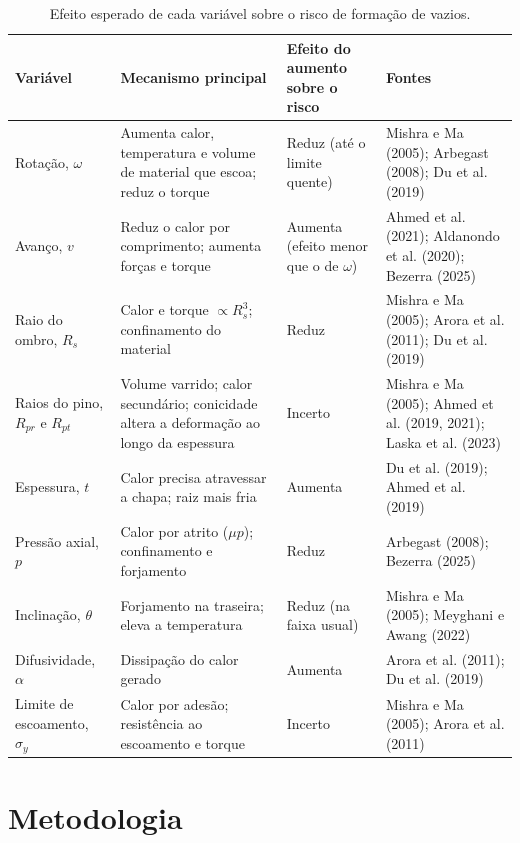 \documentclass[12pt,openany]{report}
\begin{document}
\begin{table}[htbp]
\centering
\caption{Efeito esperado de cada variável sobre o risco de formação de vazios.}
\label{tab:sintese}
\small
\begin{tabularx}{\textwidth}{L{2.3cm} Y L{2.4cm} L{3.7cm}}
\toprule
\textbf{Variável} & \textbf{Mecanismo principal} & \textbf{Efeito do aumento sobre o risco} & \textbf{Fontes} \\ \midrule
Rotação, $\omega$ & Aumenta calor, temperatura e volume de material que escoa; reduz o torque & Reduz (até o limite quente) & Mishra e Ma (2005); Arbegast (2008); Du et al. (2019) \\
Avanço, $v$ & Reduz o calor por comprimento; aumenta forças e torque & Aumenta (efeito menor que o de $\omega$) & Ahmed et al. (2021); Aldanondo et al. (2020); Bezerra (2025) \\
Raio do ombro, $R_s$ & Calor e torque $\propto R_{s}^{3}$; confinamento do material & Reduz & Mishra e Ma (2005); Arora et al. (2011); Du et al. (2019) \\
Raios do pino, $R_{pr}$ e $R_{pt}$ & Volume varrido; calor secundário; conicidade altera a deformação ao longo da espessura & Incerto & Mishra e Ma (2005); Ahmed et al. (2019, 2021); Laska et al. (2023) \\
Espessura, $t$ & Calor precisa atravessar a chapa; raiz mais fria & Aumenta & Du et al. (2019); Ahmed et al. (2019) \\
Pressão axial, $p$ & Calor por atrito ($\mu p$); confinamento e forjamento & Reduz & Arbegast (2008); Bezerra (2025) \\
Inclinação, $\theta$ & Forjamento na traseira; eleva a temperatura & Reduz (na faixa usual) & Mishra e Ma (2005); Meyghani e Awang (2022) \\
Difusividade, $\alpha$ & Dissipação do calor gerado & Aumenta & Arora et al. (2011); Du et al. (2019) \\
Limite de escoamento, $\sigma_y$ & Calor por adesão; resistência ao escoamento e torque & Incerto & Mishra e Ma (2005); Arora et al. (2011) \\ \bottomrule
\end{tabularx}
\end{table}

\chapter{Metodologia}
\label{cap:metodologia}
\end{document}
